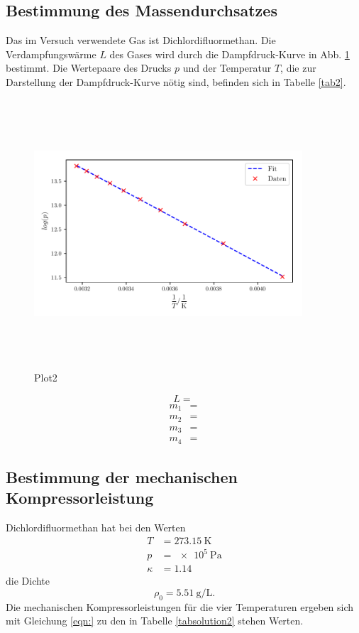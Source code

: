 \subsection{Bestimmung des Massendurchsatzes}
Das im Versuch verwendete Gas ist Dichlordifluormethan.
Die Verdampfungswärme $L$ des Gases wird durch die Dampfdruck-Kurve
in Abb. \ref{fig:plot2} bestimmt. %
Die Wertepaare des Drucks $p$ und der Temperatur $T$, die zur
Darstellung der Dampfdruck-Kurve nötig sind, befinden sich in
Tabelle \ref{tab2}. 

\begin{figure}
    \centering
    \includegraphics[width=10cm, height=10cm]{build/plot2.pdf}
    \caption{Plot2}
    \label{fig:plot2}
\end{figure}
\begin{equation*}
    L = \SI{}{} %
\end{equation*}
\begin{align*}
    m_1 &= \SI{}{} \\
    m_2 &= \SI{}{} \\
    m_3 &= \SI{}{} \\
    m_4 &= \SI{}{}
\end{align*}

\subsection{Bestimmung der mechanischen Kompressorleistung}
Dichlordifluormethan hat bei den Werten
\begin{align*}
    T &= \SI{273.15}{\kelvin} \\
    p &= \SI{e5}{\pascal} \\
    \kappa &= \num{1.14}
\end{align*}
die Dichte 
\begin{equation*}
    \rho_0 = \SI{5.51}{\gram\per\liter}.
\end{equation*}
Die mechanischen Kompressorleistungen für die vier Temperaturen
ergeben sich mit Gleichung \eqref{eqn:} %
zu den in Tabelle \ref{tabsolution2} stehen Werten.
